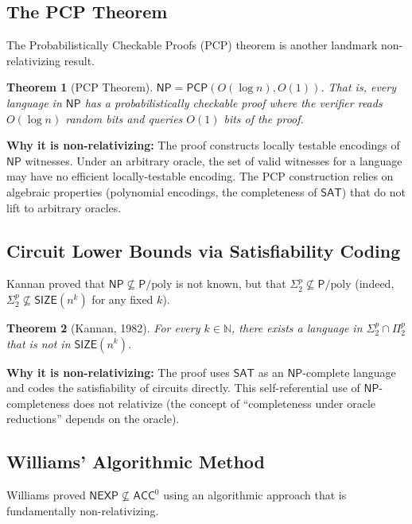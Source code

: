 \documentclass[11pt,a4paper]{article}
\theoremstyle{plain}
\newtheorem{theorem}{Theorem}[section]
\theoremstyle{definition}
\theoremstyle{remark}
\newcommand{\N}{\mathbb{N}}
\newcommand{\PP}{\mathsf{P}}
\newcommand{\NP}{\mathsf{NP}}
\newcommand{\NEXP}{\mathsf{NEXP}}
\newcommand{\ACC}{\mathsf{ACC}}
\newcommand{\PCP}{\mathsf{PCP}}
\newcommand{\SIZE}{\mathsf{SIZE}}
\newcommand{\poly}{\mathrm{poly}}
\newcommand{\SAT}{\mathsf{SAT}}
\begin{document}
\subsection{The PCP Theorem}

The Probabilistically Checkable Proofs (PCP) theorem \cite{ALMSS98,AS98} is
another landmark non-relativizing result.

\begin{theorem}[PCP Theorem]
$\NP = \PCP(O(\log n), O(1))$.  That is, every language in $\NP$ has a
probabilistically checkable proof where the verifier reads $O(\log n)$ random
bits and queries $O(1)$ bits of the proof.
\end{theorem}

\noindent\textbf{Why it is non-relativizing:} The proof constructs locally
testable encodings of $\NP$ witnesses.  Under an arbitrary oracle, the set of
valid witnesses for a language may have no efficient locally-testable encoding.
The PCP construction relies on algebraic properties (polynomial encodings, the
completeness of $\SAT$) that do not lift to arbitrary oracles.

\subsection{Circuit Lower Bounds via Satisfiability Coding}

Kannan \cite{Kannan82} proved that $\NP \not\subseteq \PP/\poly$ is not known,
but that $\Sigma_2^p \not\subseteq \PP/\poly$ (indeed,
$\Sigma_2^p \not\subseteq \SIZE(n^k)$ for any fixed $k$).

\begin{theorem}[Kannan, 1982]
For every $k \in \N$, there exists a language in $\Sigma_2^p \cap \Pi_2^p$ that
is not in $\SIZE(n^k)$.
\end{theorem}

\noindent\textbf{Why it is non-relativizing:} The proof uses $\SAT$ as an
$\NP$-complete language and codes the satisfiability of circuits directly.
This self-referential use of $\NP$-completeness does not relativize (the
concept of ``completeness under oracle reductions'' depends on the oracle).

\subsection{Williams' Algorithmic Method}

Williams \cite{Williams14} proved $\NEXP \not\subseteq \ACC^0$ using an
algorithmic approach that is fundamentally non-relativizing.
\end{document}
